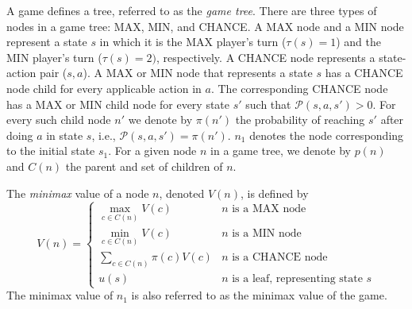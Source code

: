 \documentclass[letterpaper]{article} %
\newcounter{bab}
\newcommand{\MM}{\mathit{V}}
\newcommand{\rootnode}{\mathit{n_1}}
\begin{document}
A game defines a tree, referred to as the \emph{game tree}.
There are three types of nodes in a game tree: MAX, MIN, and CHANCE. 
A MAX node and a MIN node represent a state $s$ in which it is the MAX player's  turn ($\tau(s)=1$) and the MIN player's turn ($\tau(s)=2)$, respectively. 
A CHANCE node represents a state-action pair ($s,a$). 
A MAX or MIN node that represents a state $s$ 
has a CHANCE node child for every applicable action in $a$. 
The corresponding CHANCE node has a MAX or MIN child node for every state $s'$ 
such that $\mathcal{P}(s,a,s')>0$. For every such child node $n'$ we denote by $\pi(n')$ the probability of reaching $s'$ after doing $a$ in state $s$, i.e., $\mathcal{P}(s,a,s')=\pi(n')$. 
$\rootnode$ denotes the node corresponding to the initial state $s_1$. 
For a given node $n$ in a game tree, we denote by $p(n)$ and $C(n)$ the parent and set of children of $n$.



The \emph{minimax} value of a node $n$, denoted $\MM(n)$, is defined by
\begin{equation} 
  \MM(n) \!=\!
    \begin{cases} 
      \max\limits_{c\in C(n)} \MM(c) & \!n \text{ is a MAX node} \\
      \min\limits_{c\in C(n)} \MM(c) & \!n \text{ is a MIN node} \\
      \sum\limits_{c\in C(n)\!\!\!\!\!\!\!\!\!\!\!\!} \pi(c) \MM(c) & \!n \text{ is a CHANCE node} \\
      u(s) & \!n \text{ is a leaf, representing state } s\!\!\!\!\!\!
     \end{cases}
   \label{eq:mm-value-chance}
\end{equation}
The minimax value of $\rootnode{}$ is also referred to as the minimax value of the game. 
\end{document}
